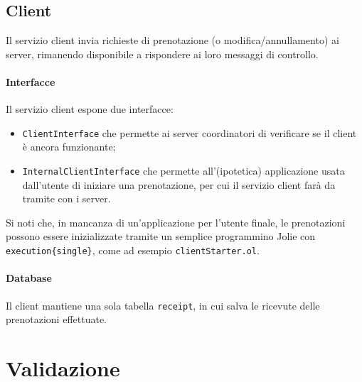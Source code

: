 \documentclass[a4paper]{article}
\begin{document}
\subsection{Client}
Il servizio client invia richieste di prenotazione (o modifica/annullamento) ai server, rimanendo disponibile a rispondere ai loro messaggi di controllo.

\paragraph{Interfacce} Il servizio client espone due interfacce:
\begin{itemize}
	\item \texttt{ClientInterface} che permette ai server coordinatori di verificare se il client è ancora funzionante;
	\item \texttt{InternalClientInterface} che permette all'(ipotetica) applicazione usata dall'utente di iniziare una prenotazione, per cui il servizio client farà da tramite con i server. 
\end{itemize}

Si noti che, in mancanza di un'applicazione per l'utente finale, le prenotazioni possono essere inizializzate tramite un semplice programmino Jolie con \texttt{execution\{single\}}, come ad esempio \texttt{clientStarter.ol}.

\paragraph{Database} Il client mantiene una sola tabella \texttt{receipt}, in cui salva le ricevute delle prenotazioni effettuate.


\section{Validazione}
\end{document}
